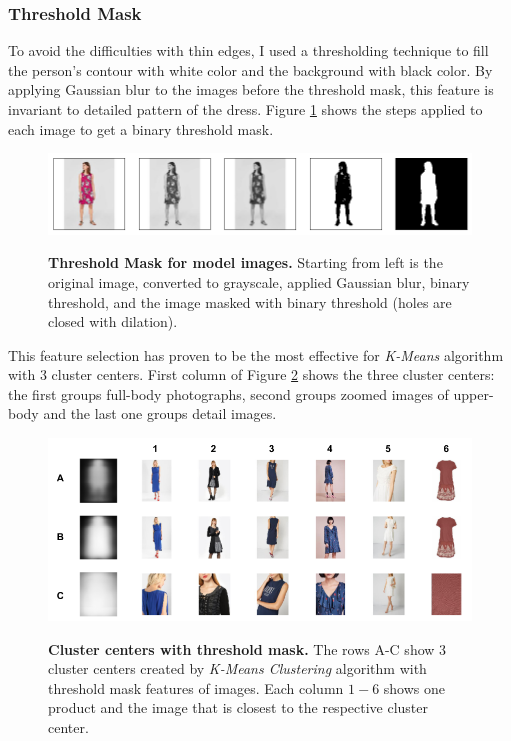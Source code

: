 \documentclass[12pt]{report}
\begin{document}
\subsubsection{Threshold Mask}
To avoid the difficulties with thin edges, I used a thresholding technique to fill the person's contour with white color and the background with black color. By applying Gaussian blur to the images before the threshold mask, this feature is invariant to detailed pattern of the dress. Figure \ref{fig:cluster_outline_data} shows the steps applied to each image to get a binary threshold mask.

\begin{figure}[h]
\centering
{\includegraphics[width=\linewidth]{04_experiments/clustering/outlines_data}}
\caption{\label{fig:cluster_outline_data} \textbf{Threshold Mask for model images.} Starting from left is the original image, converted to grayscale, applied Gaussian blur, binary threshold, and the image masked with binary threshold (holes are closed with dilation).}
\end{figure}

This feature selection has proven to be the most effective for \textit{K-Means} algorithm with 3 cluster centers. First column of Figure \ref{fig:cluster_outline} shows the three cluster centers: the first groups full-body photographs, second groups zoomed images of upper-body and the last one groups detail images. 

\begin{figure}[h]
\centering
{\includegraphics[width=\linewidth]{04_experiments/clustering/outlines_clusters}}
\caption{\label{fig:cluster_outline} \textbf{Cluster centers with threshold mask.} The rows A-C show 3 cluster centers created by \textit{K-Means Clustering} algorithm with threshold mask features of images. Each column $1-6$ shows one product and the image that is closest to the respective cluster center.}
\end{figure}
\end{document}
